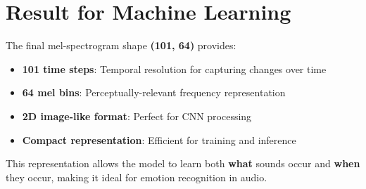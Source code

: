 \documentclass[12pt]{article}
\begin{document}
\section{Result for Machine Learning}

The final mel-spectrogram shape \textbf{(101, 64)} provides:
\begin{itemize}
    \item \textbf{101 time steps}: Temporal resolution for capturing changes over time
    \item \textbf{64 mel bins}: Perceptually-relevant frequency representation
    \item \textbf{2D image-like format}: Perfect for CNN processing
    \item \textbf{Compact representation}: Efficient for training and inference
\end{itemize}

This representation allows the model to learn both \textbf{what} sounds occur and \textbf{when} they occur, making it ideal for emotion recognition in audio.
\end{document}
